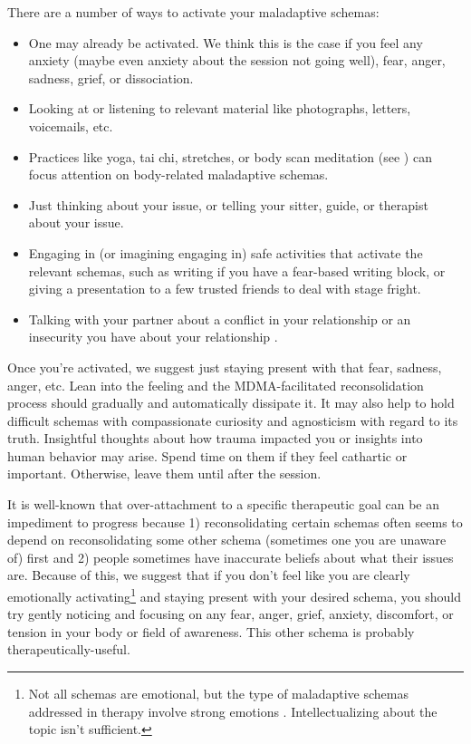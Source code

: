 \documentclass[12pt,letterpaper]{book}
\begin{document}
There are a number of ways to activate your maladaptive schemas:
\begin{itemize}
    \item One may already be activated. We think this is the case if you feel any anxiety (maybe even anxiety about the session not going well), fear, anger, sadness, grief, or dissociation.
    \item Looking at or listening to relevant material like photographs, letters, voicemails, etc.
    \item Practices like yoga, tai chi, stretches, or body scan meditation (see \textcite{bodyscan}) can focus attention on body-related maladaptive schemas.
    \item Just thinking about your issue, or telling your sitter, guide, or therapist about your issue.
    \item Engaging in (or imagining engaging in) safe activities that activate the relevant schemas, such as writing if you have a fear-based writing block, or giving a presentation to a few trusted friends to deal with stage fright.
    \item Talking with your partner about a conflict in your relationship or an insecurity you have about your relationship \cite{colbertEvenings}.
\end{itemize}
Once you're activated, we suggest just staying present with that fear, sadness, anger, etc. Lean into the feeling and the MDMA-facilitated reconsolidation process should gradually and automatically dissipate it. It may also help to hold difficult schemas with compassionate curiosity and agnosticism with regard to its truth. Insightful thoughts about how trauma impacted you or insights into human behavior may arise. Spend time on them if they feel cathartic or important. Otherwise, leave them until after the session.

It is well-known that over-attachment to a specific therapeutic goal can be an impediment to progress because 1) reconsolidating certain schemas often seems to depend on reconsolidating some other schema (sometimes one you are unaware of) first and 2) people sometimes have inaccurate beliefs about what their issues are. Because of this, we suggest that if you don't feel like you are clearly emotionally activating\footnote{Not all schemas are emotional, but the type of maladaptive schemas addressed in therapy involve strong emotions \cite{eckerUnlocking}. Intellectualizing about the topic isn't sufficient.} and staying present with your desired schema, you should try gently noticing and focusing on any fear, anger, grief, anxiety, discomfort, or tension in your body or field of awareness. This other schema is probably therapeutically-useful.
\end{document}
